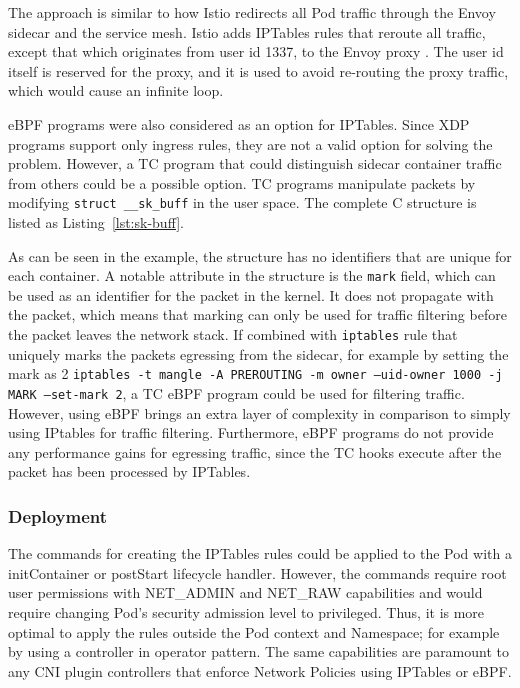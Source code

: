 \documentclass[english, 12pt, a4paper, sci, utf8, a-2b, online]{aaltothesis}
\begin{document}
The approach is similar to how Istio redirects all Pod traffic through the Envoy sidecar and the service mesh.
Istio adds IPTables rules that reroute all traffic, except that which originates from user id 1337, to the Envoy proxy \cite{istio-iptables}.
The user id itself is reserved for the proxy, and it is used to avoid re-routing the proxy traffic, which would cause an infinite loop.

eBPF programs were also considered as an option for IPTables.
Since XDP programs support only ingress rules, they are not a valid option for solving the problem.
However, a TC program that could distinguish sidecar container traffic from others could be a possible option.
TC programs manipulate packets by modifying \texttt{struct \_\_sk\_buff} in the user space.
The complete C structure is listed as Listing~\ref{lst:sk-buff}.



As can be seen in the example, the structure has no identifiers that are unique for each container.
A notable attribute in the structure is the \texttt{mark} field, which can be used as an identifier for the packet in the kernel.
It does not propagate with the packet, which means that marking can only be used for traffic filtering before the packet leaves the network stack.
If combined with \texttt{iptables} rule that uniquely marks the packets egressing from the sidecar, for example by setting the mark as 2 \texttt{iptables -t mangle -A PREROUTING -m owner --uid-owner 1000 -j MARK --set-mark 2}, a TC eBPF program could be used for filtering traffic.
However, using eBPF brings an extra layer of complexity in comparison to simply using IPtables for traffic filtering.
Furthermore, eBPF programs do not provide any performance gains for egressing traffic, since the TC hooks execute after the packet has been processed by IPTables.

\subsubsection{Deployment} \label{sec:network-solution:deployment}

The commands for creating the IPTables rules could be applied to the Pod with a initContainer or postStart lifecycle handler.
However, the commands require root user permissions with NET\_ADMIN and NET\_RAW capabilities and would require changing Pod's security admission level to privileged.
Thus, it is more optimal to apply the rules outside the Pod context and Namespace; for example by using a controller in operator pattern.
The same capabilities are paramount to any CNI plugin controllers that enforce Network Policies using IPTables or eBPF.
\end{document}
